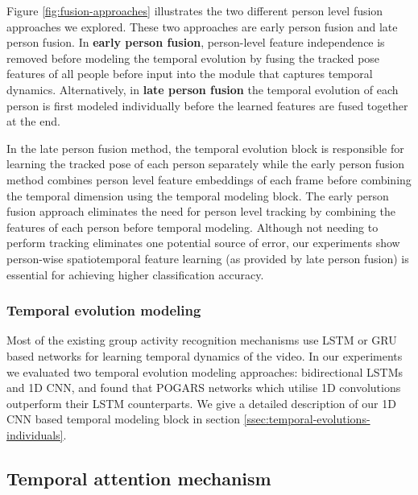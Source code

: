 \documentclass[a4paper,fleqn]{cas-dc}
\begin{document}
Figure \ref{fig:fusion-approaches} illustrates the two different person level fusion approaches we explored. 
These two approaches are early person fusion and late person fusion. 
In \textbf{early person fusion}, person-level feature independence is removed before modeling the temporal evolution by fusing the tracked pose features of all people before input into the module that captures temporal dynamics. 
Alternatively, in \textbf{late person fusion} the temporal evolution of each person is first modeled individually before the learned features are fused together at the end.

In the late person fusion method, the temporal evolution block is responsible for learning the tracked pose of each person separately while the early person fusion method combines person level feature embeddings of each frame before combining the temporal dimension using the temporal modeling block. 
The early person fusion approach eliminates the need for person level tracking by combining the features of each person before temporal modeling. 
Although not needing to perform tracking eliminates one potential source of error, our experiments show person-wise spatiotemporal feature learning (as provided by late person fusion) is essential for achieving higher classification accuracy.

\subsubsection{Temporal evolution modeling}
\label{sssec:temporal-evolution-modeling}

Most of the existing group activity recognition mechanisms \cite{Deng_2016_structureInference,Ibrahim2016_hierarchical_deep,Tsunoda2017_footballAction,Lu2019_spatioTempAtt} use LSTM or GRU based networks for learning temporal dynamics of the video. 
In our experiments we evaluated two temporal evolution modeling  approaches: bidirectional LSTMs and 1D CNN, and found that POGARS networks which utilise 1D convolutions outperform their LSTM counterparts. 
We give a detailed description of our 1D CNN based temporal modeling block in section \ref{ssec:temporal-evolutions-individuals}.

\subsection{Temporal attention mechanism}
\label{ssec:temporal-attention-mechanism}
\end{document}
